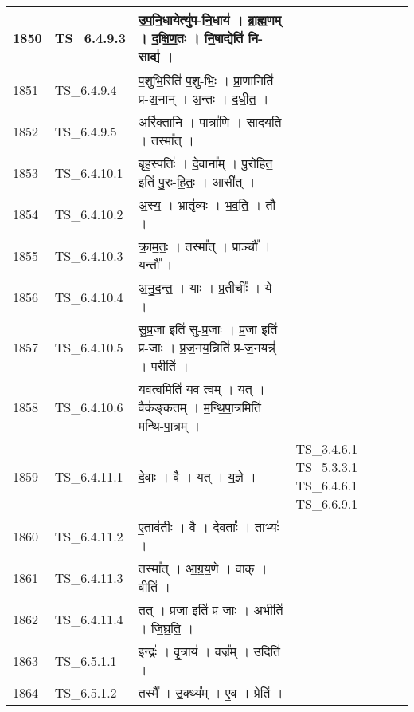 \documentclass[17pt]{extarticle}
\begin{document}
\begin{longtable}{||p{0.4in}||p{0.9in}||p{4.0in}||p{0.9in}||}
        \hline
            1850 & TS\_6.4.9.3 & उ॒प॒नि॒धायेत्यु॑प{-}नि॒धाय॑   ।   ब्रा॒ह्म॒णम्   ।   द॒क्षि॒ण॒तः   ।   नि॒षाद्येति॑ नि{-}साद्य॑   ।    &      \\
        \hline
            1851 & TS\_6.4.9.4 & प॒शुभि॒रिति॑ प॒शु{-}भिः॒   ।   प्रा॒णानिति॑ प्र{-}अ॒नान्   ।   अ॒न्तः   ।   द॒धी॒त॒   ।    &      \\
        \hline
            1852 & TS\_6.4.9.5 & अरि॑क्तानि   ।   पात्रा॑णि   ।   सा॒द॒य॒ति॒   ।   तस्मा᳚त्   ।    &      \\
        \hline
            1853 & TS\_6.4.10.1 & बृह॒स्पतिः॑   ।   दे॒वाना᳚म्   ।   पु॒रोहि॑त॒ इति॑ पु॒रः{-}हि॒तः॒   ।   आसी᳚त्   ।    &      \\
        \hline
            1854 & TS\_6.4.10.2 & अ॒स्य॒   ।   भ्रातृ॑व्यः   ।   भ॒व॒ति॒   ।   तौ   ।    &      \\
        \hline
            1855 & TS\_6.4.10.3 & क्रा॒म॒तः॒   ।   तस्मा᳚त्   ।   प्राञ्चौ᳚   ।   यन्तौ᳚   ।    &      \\
        \hline
            1856 & TS\_6.4.10.4 & अ॒नु॒द॒न्त॒   ।   याः   ।   प्र॒तीचीः᳚   ।   ये   ।    &      \\
        \hline
            1857 & TS\_6.4.10.5 & सु॒प्र॒जा इति॑ सु{-}प्र॒जाः   ।   प्र॒जा इति॑ प्र{-}जाः   ।   प्र॒ज॒नय॒न्निति॑ प्र{-}ज॒नयन्न्॑   ।   परीति॑   ।    &      \\
        \hline
            1858 & TS\_6.4.10.6 & य॒व॒त्वमिति॑ यव{-}त्वम्   ।   यत्   ।   वैक॑ङ्कतम्   ।   म॒न्थि॒पा॒त्रमिति॑ मन्थि{-}पा॒त्रम्   ।    &      \\
        \hline
            1859 & TS\_6.4.11.1 & दे॒वाः   ।   वै   ।   यत्   ।   य॒ज्ञे   ।    & TS\_3.4.6.1 TS\_5.3.3.1 TS\_6.4.6.1  TS\_6.6.9.1       \\
        \hline
            1860 & TS\_6.4.11.2 & ए॒ताव॑तीः   ।   वै   ।   दे॒वताः᳚   ।   ताभ्यः॑   ।    &      \\
        \hline
            1861 & TS\_6.4.11.3 & तस्मा᳚त्   ।   आ॒ग्र॒य॒णे   ।   वाक्   ।   वीति॑   ।    &      \\
        \hline
            1862 & TS\_6.4.11.4 & तत्   ।   प्र॒जा इति॑ प्र{-}जाः   ।   अ॒भीति॑   ।   जि॒घ्र॒ति॒   ।    &      \\
        \hline
            1863 & TS\_6.5.1.1 & इन्द्रः॑   ।   वृ॒त्राय॑   ।   वज्र᳚म्   ।   उदिति॑   ।    &      \\
        \hline
            1864 & TS\_6.5.1.2 & तस्मै᳚   ।   उ॒क्थ्य᳚म्   ।   ए॒व   ।   प्रेति॑   ।    &      \\

\end{longtable}
\end{document}
